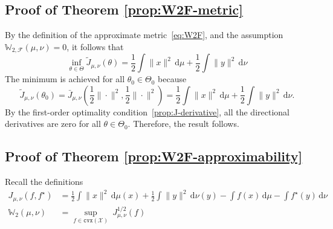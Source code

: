 \documentclass[10pt]{article}
\newcommand{\ud}{\,\mathrm{d}}
\newcommand{\norm}[1]{\|#1\|}
\renewcommand{\tilde}{\widetilde}
\newcommand{\cvx}{\mathtt{cvx}}
\newcommand{\W}{\mathds{W}}
\newcommand{\calF}{\mathcal{F}}
\newcommand{\calX}{\mathcal{X}}
\numberwithin{equation}{section}
\begin{document}
\subsection{Proof of Theorem \ref{prop:W2F-metric}}\label{apdx:prop-W2F-metric}
By the definition of the approximate metric~\eqref{eq:W2F}, and the assumption $\W_{2,\calF}(\mu,\nu)=0$, it follows that \[\inf_{\theta \in \Theta} \tilde{J}_{\mu,\nu}(\theta)=\frac{1}{2}\int \norm{x}^2 \ud \mu + \frac{1}{2}\int \norm{y}^2\ud \nu\]
The minimum is achieved for all $\theta_0 \in \Theta_0$ because \[\tilde{J}_{\mu,\nu}(\theta_0)=\bar{J}_{\mu,\nu}(\frac{1}{2}\norm{\cdot}^2,\frac{1}{2}\norm{\cdot}^2) =\frac{1}{2}\int \norm{x}^2 \ud \mu + \frac{1}{2}\int \norm{y}^2\ud \nu.\] 
{ By the first-order optimality condition~\autoref{prop:J-derivative}, all the directional derivatives are zero for all $\theta \in \Theta_0$. Therefore, the result follows.
}

\subsection{Proof of Theorem \ref{prop:W2F-approximability}}\label{apdx:prop-W2F-approximability}
Recall the definitions 
\begin{align}
J_{\mu,\nu}(f,f^\star) &= \frac{1}{2}\int \norm{x}^2\ud \mu(x) + \frac{1}{2}\int \norm{y}^2\ud \nu(y)- \int f(x)\ud \mu - \int f^\star(y) \ud \nu \label{eq:J-def}\\
\W_{2}(\mu,\nu) &= \sup_{f \in \cvx(\calX)}~J^{1/2}_{\mu,\nu}(f) \nonumber
\end{align}
\end{document}
